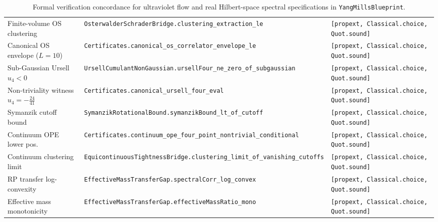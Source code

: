 \documentclass[11pt,a4paper]{article}
\begin{document}
\begin{table}[ht]
\begin{tabular}{@{}p{4.3cm}p{6.6cm}p{3.4cm}@{}}
Finite-volume OS clustering & \texttt{OsterwalderSchraderBridge.}\newline\texttt{clustering\_extraction\_le} & \texttt{[propext, Classical.choice,} \texttt{Quot.sound]} \\
Canonical OS envelope ($L=10$) & \texttt{Certificates.}\newline\texttt{canonical\_os\_correlator\_envelope\_le} & \texttt{[propext, Classical.choice,} \texttt{Quot.sound]} \\
Sub-Gaussian Ursell $u_4 < 0$ & \texttt{UrsellCumulantNonGaussian.}\newline\texttt{ursellFour\_ne\_zero\_of\_subgaussian} & \texttt{[propext, Classical.choice,} \texttt{Quot.sound]} \\
Non-triviality witness $u_4 = -\frac{24}{41}$ & \texttt{Certificates.}\newline\texttt{canonical\_ursell\_four\_eval} & \texttt{[propext, Classical.choice,} \texttt{Quot.sound]} \\
Symanzik cutoff bound & \texttt{SymanzikRotationalBound.}\newline\texttt{symanzikBound\_lt\_of\_cutoff} & \texttt{[propext, Classical.choice,} \texttt{Quot.sound]} \\
Continuum OPE lower pos. & \texttt{Certificates.}\newline\texttt{continuum\_ope\_four\_point\_\-nontrivial\_conditional} & \texttt{[propext, Classical.choice,} \texttt{Quot.sound]} \\
Continuum clustering limit & \texttt{EquicontinuousTightnessBridge.}\newline\texttt{clustering\_limit\_of\_vanishing\_cutoffs} & \texttt{[propext, Classical.choice,} \texttt{Quot.sound]} \\
RP transfer log-convexity & \texttt{EffectiveMassTransferGap.}\newline\texttt{spectralCorr\_log\_convex} & \texttt{[propext, Classical.choice,} \texttt{Quot.sound]} \\
Effective mass monotonicity & \texttt{EffectiveMassTransferGap.}\newline\texttt{effectiveMassRatio\_mono} & \texttt{[propext, Classical.choice,} \texttt{Quot.sound]} \\
\bottomrule
\end{tabular}
\caption{Formal verification concordance for ultraviolet flow and real Hilbert-space spectral specifications in \texttt{YangMillsBlueprint}.}
\label{tab:paper1-concordance}
\end{table}



\end{document}
